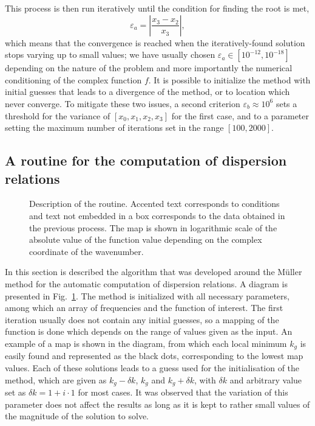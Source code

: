 This process is then run iteratively until the condition for finding the root is met, 
\begin{equation}
    \varepsilon_a=\left|\frac{x_3-x_2}{x_3}\right|,
\end{equation}
which means that the convergence is reached when the iteratively-found solution stops varying up to small values; we have usually chosen $\varepsilon_a \in \left[ 10^{-12}, 10^{-18} \right]$ depending on the nature of the problem and more importantly the numerical conditioning of the complex function $f$. It is possible to initialize the method with initial guesses that leads to a divergence of the method, or to location which never converge. To mitigate these two issues, a second criterion $\varepsilon_b \approx 10^6$ sets a threshold for the variance of $[x_0, x_1, x_2, x_3]$ for the first case, and to a parameter setting the maximum number of iterations set in the range $[100, 2000]$.

\subsection{A routine for the computation of dispersion relations}
\begin{figure}[htpb]
    \centering
    
    \vspace*{2.5em}
    \caption{Description of the routine. Accented text corresponds to conditions and text not embedded in a box corresponds to the data obtained in the previous process. The map is shown in logarithmic scale of the absolute value of the function value depending on the complex coordinate of the wavenumber.}
    \label{fig:muller_schema}
\end{figure}

In this section is described the algorithm that was developed around the Müller method for the automatic computation of dispersion relations. A diagram is presented in Fig.~\ref{fig:muller_schema}. The method is initialized with all necessary parameters, among which an array of frequencies and the function of interest. The first iteration usually does not contain any initial guesses, so a mapping of the function is done which depends on the range of values given as the input. An example of a map is shown in the diagram, from which each local minimum $k_g$ is easily found and represented as the black dots, corresponding to the lowest map values. Each of these solutions leads to a guess used for the initialisation of the method, which are given as $k_g - \delta k$, $k_g$ and $k_g + \delta k$, with $\delta k$ and arbitrary value set as $\delta k = 1+i\cdot 1$ for most cases. It was observed that the variation of this parameter does not affect the results as long as it is kept to rather small values of the magnitude of the solution to solve.

